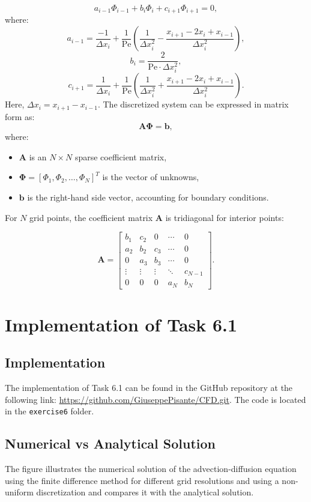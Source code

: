 \documentclass{article}
\begin{document}
\[
a_{i-1} \Phi_{i-1} + b_i \Phi_i + c_{i+1} \Phi_{i+1} = 0,
\]
where:
\[
a_{i-1} = \frac{-1}{\Delta x_i} + \frac{1}{\text{Pe}} \left( \frac{1}{\Delta x_i^2} - \frac{x_{i+1} - 2x_i + x_{i-1}}{\Delta x_i^2} \right),
\]
\[
b_i = \frac{2}{\text{Pe} \cdot \Delta x_i^2},
\]
\[
c_{i+1} = \frac{1}{\Delta x_i} + \frac{1}{\text{Pe}} \left( \frac{1}{\Delta x_i^2} + \frac{x_{i+1} - 2x_i + x_{i-1}}{\Delta x_i^2} \right).
\]
Here, \(\Delta x_i = x_{i+1} - x_{i-1}\).
The discretized system can be expressed in matrix form as:
\[
\mathbf{A} \boldsymbol{\Phi} = \mathbf{b},
\]
where:
\begin{itemize}
    \item \(\mathbf{A}\) is an \(N \times N\) sparse coefficient matrix,
    \item \(\boldsymbol{\Phi} = [\Phi_1, \Phi_2, \dots, \Phi_N]^T\) is the vector of unknowns,
    \item \(\mathbf{b}\) is the right-hand side vector, accounting for boundary conditions.
\end{itemize}
For \(N\) grid points, the coefficient matrix \(\mathbf{A}\) is tridiagonal for interior points:

\[
\mathbf{A} =
\begin{bmatrix}
b_1 & c_2 & 0 & \cdots & 0 \\
a_2 & b_2 & c_3 & \cdots & 0 \\
0 & a_3 & b_3 & \cdots & 0 \\
\vdots & \vdots & \vdots & \ddots & c_{N-1} \\
0 & 0 & 0 & a_{N} & b_{N}
\end{bmatrix}.
\]

\section{Implementation of Task 6.1}

\subsection{Implementation}

The implementation of Task 6.1 can be found in the GitHub repository at the following link: \url{https://github.com/GiuseppePisante/CFD.git}. 
The code is located in the \texttt{exercise6} folder. 

\subsection{Numerical vs Analytical Solution}
The figure illustrates the numerical solution of the advection-diffusion equation using the finite difference method for different 
grid resolutions and using a non-uniform discretization and compares it with the analytical solution. 
\end{document}
